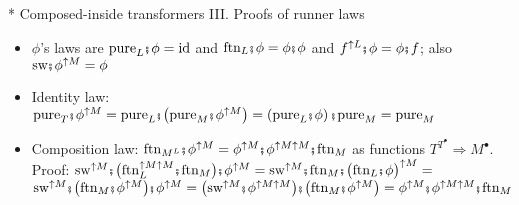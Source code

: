 \documentclass[english]{beamer}
\newcommand{\bef}{\hspace{0.5pt}\ensuremath\mathsmaller{\fatsemi}\hspace{1.5pt}}
\begin{document}
\begin{frame}{{*} Composed-inside transformers III. Proofs of runner laws}
\begin{itemize}
is also a monadic morphism
\item {\footnotesize{}$\phi$'s laws are $\text{pure}_{L}\bef\phi=\text{id}$
and $\text{ftn}_{L}\bef\phi=\phi\bef\phi$ and $f^{\uparrow L}\bef\phi=\phi\bef f$;
also $\text{sw}\bef\phi^{\uparrow M}=\phi$}{\footnotesize\par}
\item {\footnotesize{}Identity law: $\text{pure}_{T}\bef\phi^{\uparrow M}=\text{pure}_{L}\bef\big(\text{pure}_{M}\bef\phi^{\uparrow M}\big)=\left(\text{pure}_{L}\bef\phi\right)\bef\text{pure}_{M}=\text{pure}_{M}$ }{\footnotesize\par}
\item {\footnotesize{}\vspace{-0.1cm}Composition law: $\text{ftn}_{M^{L}}\bef\phi^{\uparrow M}=\phi^{\uparrow M}\bef\phi^{\uparrow M\uparrow M}\bef\text{ftn}_{M}$
as functions $T^{T^{\bullet}}\Rightarrow M^{\bullet}$. Proof: $\text{sw}^{\uparrow M}\bef\big(\text{ftn}_{L}^{\uparrow M\uparrow M}\bef\text{ftn}_{M}\big)\bef\phi^{\uparrow M}=\text{sw}^{\uparrow M}\bef\text{ftn}_{M}\bef\big(\text{ftn}_{L}\bef\phi\big)^{\uparrow M}=$
$\text{sw}^{\uparrow M}\bef\big(\text{ftn}_{M}\bef\phi^{\uparrow M}\big)\bef\phi^{\uparrow M}=\big(\text{sw}^{\uparrow M}\bef\phi^{\uparrow M\uparrow M}\big)\bef\big(\text{ftn}_{M}\bef\phi^{\uparrow M}\big)=\phi^{\uparrow M}\bef\phi^{\uparrow M\uparrow M}\bef\text{ftn}_{M}$}{\footnotesize\par}
\end{itemize}
\end{frame}
\end{document}
